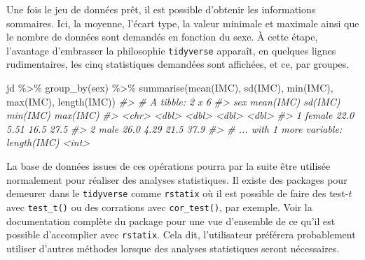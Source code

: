 \documentclass[
]{book}
\newenvironment{Shaded}{}{}
\newcommand{\CommentTok}[1]{\textit{#1}}
\newcommand{\FunctionTok}[1]{#1}
\newcommand{\NormalTok}[1]{#1}
\newcommand{\SpecialCharTok}[1]{#1}
\begin{document}
Une fois le jeu de données prêt, il est possible d'obtenir les informations sommaires. Ici, la moyenne, l'écart type, la valeur minimale et maximale ainsi que le nombre de données sont demandés en fonction du sexe. À cette étape, l'avantage d'embrasser la philosophie \texttt{tidyverse} apparaît, en quelques lignes rudimentaires, les cinq statistiques demandées sont affichées, et ce, par groupes.

\begin{Shaded}
\begin{Highlighting}[]
\NormalTok{jd }\SpecialCharTok{\%\textgreater{}\%} 
  \FunctionTok{group\_by}\NormalTok{(sex) }\SpecialCharTok{\%\textgreater{}\%} 
  \FunctionTok{summarise}\NormalTok{(}\FunctionTok{mean}\NormalTok{(IMC), }\FunctionTok{sd}\NormalTok{(IMC), }\FunctionTok{min}\NormalTok{(IMC), }\FunctionTok{max}\NormalTok{(IMC), }\FunctionTok{length}\NormalTok{(IMC)) }
\CommentTok{\#\textgreater{} \# A tibble: 2 x 6}
\CommentTok{\#\textgreater{}   sex    \textasciigrave{}mean(IMC)\textasciigrave{} \textasciigrave{}sd(IMC)\textasciigrave{} \textasciigrave{}min(IMC)\textasciigrave{} \textasciigrave{}max(IMC)\textasciigrave{}}
\CommentTok{\#\textgreater{}   \textless{}chr\textgreater{}        \textless{}dbl\textgreater{}     \textless{}dbl\textgreater{}      \textless{}dbl\textgreater{}      \textless{}dbl\textgreater{}}
\CommentTok{\#\textgreater{} 1 female        22.0      5.51       16.5       27.5}
\CommentTok{\#\textgreater{} 2 male          26.0      4.29       21.5       37.9}
\CommentTok{\#\textgreater{} \# ... with 1 more variable: \textasciigrave{}length(IMC)\textasciigrave{} \textless{}int\textgreater{}}
\end{Highlighting}
\end{Shaded}

La base de données issues de ces opérations pourra par la suite être utilisée normalement pour réaliser des analyses statistiques. Il existe des packages pour demeurer dans le \texttt{tidyverse} comme \texttt{rstatix} où il est possible de faire des test-\(t\) avec \texttt{test\_t()} ou des corrations avec \texttt{cor\_test()}, par exemple. Voir la documentation complète du package pour une vue d'ensemble de ce qu'il est possible d'accomplier avec \texttt{rstatix}. Cela dit, l'utilisateur préférera probablement utiliser d'autres méthodes lorsque des analyses statistiques seront nécessaires.
\end{document}
